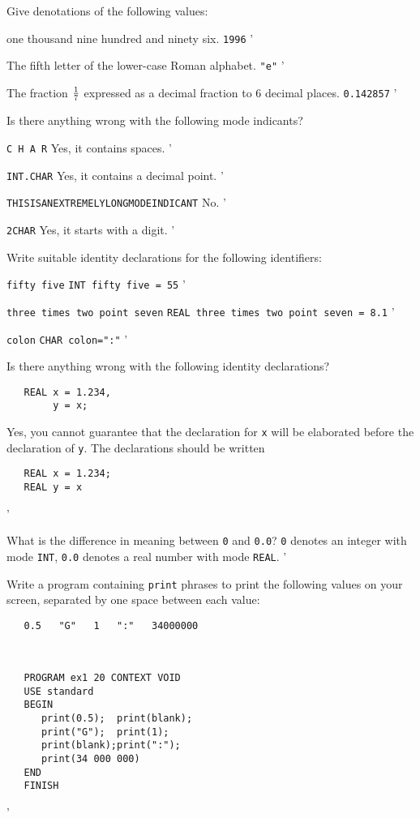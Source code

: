 \begin{exercise}
\item Give denotations of the following values:
\begin{subex}
\item one thousand nine hundred and ninety six. \subans \verb|1996|
'
\item The fifth letter of the lower-case Roman alphabet.
\subans \verb|"e"|
'
\item The fraction $1\over7$ expressed as a decimal fraction to 6
decimal places. \subans \verb|0.142857|
'
\end{subex}
\item Is there anything wrong with the following mode indicants?
\begin{subex}
\item \verb|C H A R| \subans Yes, it contains spaces.
'
\item \verb|INT.CHAR| \subans Yes, it contains a decimal point.
'
\item \verb|THISISANEXTREMELYLONGMODEINDICANT| \subans No.
'
\item \verb|2CHAR| \subans Yes, it starts with a digit.
'
\end{subex}
\item Write suitable identity declarations for the following
identifiers:
\begin{subex}
\item \verb|fifty five| \subans \verb|INT fifty five = 55|
'
\item \verb|three times two point seven|
\subans \verb|REAL three times two point seven = 8.1|
'
\item \verb|colon| \subans \verb|CHAR colon=":"|
'
\end{subex}
\item Is there anything wrong with the following identity declarations?
\begin{verbatim}
   REAL x = 1.234,
        y = x;
\end{verbatim}
\indent\ans Yes, you cannot guarantee that the declaration for
\verb|x| will be elaborated before the declaration of \verb|y|. The
declarations should be written
\begin{verbatim}
   REAL x = 1.234;
   REAL y = x
\end{verbatim}
'
\item What is the difference in meaning between \verb|0| and
\verb|0.0|?  \ans \verb|0| denotes an integer with mode \verb|INT|,
\verb|0.0| denotes a real number with mode \verb|REAL|.
'
\item Write a program containing \verb|print| phrases to print the
following values on your screen, separated by one space between each
value:
\begin{verbatim}
   0.5   "G"   1   ":"   34000000
\end{verbatim}
\indent\ans \ %
\begin{verbatim}
   PROGRAM ex1 20 CONTEXT VOID
   USE standard
   BEGIN
      print(0.5);  print(blank);
      print("G");  print(1);
      print(blank);print(":");
      print(34 000 000)
   END
   FINISH
\end{verbatim}
'
\end{exercise}
